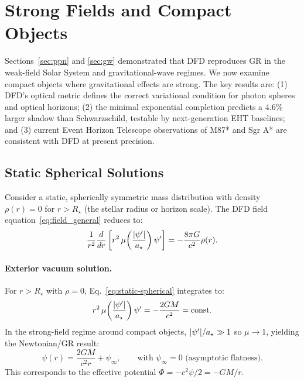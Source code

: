 
\section{Strong Fields and Compact Objects}\label{sec:strong}

Sections~\ref{sec:ppn} and \ref{sec:gw} demonstrated that DFD reproduces GR in the weak-field Solar System and gravitational-wave regimes.  We now examine compact objects where gravitational effects are strong.  The key results are: (1) DFD's optical metric defines the correct variational condition for photon spheres and optical horizons; (2) the minimal exponential completion predicts a 4.6\% larger shadow than Schwarzschild, testable by next-generation EHT baselines; and (3) current Event Horizon Telescope observations of M87* and Sgr A* are consistent with DFD at present precision.

\subsection{Static Spherical Solutions}\label{sec:strong-static}

Consider a static, spherically symmetric mass distribution with density $\rho(r) = 0$ for $r > R_\star$ (the stellar radius or horizon scale). The DFD field equation~\eqref{eq:field_general} reduces to:
\begin{equation}\label{eq:static-spherical}
\frac{1}{r^2}\frac{d}{dr}\left[r^2\,\mu\!\left(\frac{|\psi'|}{a_\star}\right)\psi'\right] = -\frac{8\pi G}{c^2}\rho(r).
\end{equation}

\paragraph{Exterior vacuum solution.}
For $r > R_\star$ with $\rho = 0$, Eq.~\eqref{eq:static-spherical} integrates to:
\begin{equation}
r^2\,\mu\!\left(\frac{|\psi'|}{a_\star}\right)\psi' = -\frac{2GM}{c^2} = \text{const.}
\end{equation}
In the strong-field regime around compact objects, $|\psi'|/a_\star \gg 1$ so $\mu \to 1$, yielding the Newtonian/GR result:
\begin{equation}\label{eq:psi-exterior}
\psi(r) = \frac{2GM}{c^2 r} + \psi_\infty, \qquad \text{with } \psi_\infty = 0 \text{ (asymptotic flatness)}.
\end{equation}
This corresponds to the effective potential $\Phi = -c^2\psi/2 = -GM/r$.

